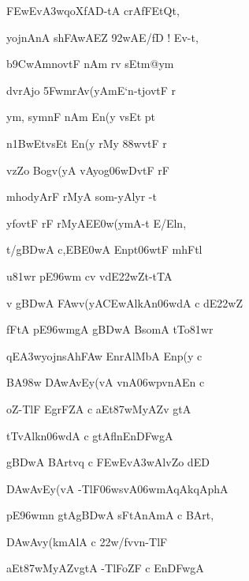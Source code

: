 {\dn \3FEwEv\3A3wqoXfAD-tA\2 crAfFEtQt, \vegdn\dontdisplaylinenum}

{\dn yojnAnA\2 sh\3FAwAEZ \392wAE/\2fD\0 {\rs !\re} Ev-t,{\dandabdn} \dontdisplaylinenum}

{\dn b\5\39CwAmnovtF nAm r\?v sEtm@ym\? \vegdn\dontdisplaylinenum}

{\dn d\?vrAjo \35FwmrAv(yAmE`n-t\?jovtF r\? \vegdn\dontdisplaylinenum}

{\dn ym, s\2ymnF nAm En(y\2 vsEt pt\?{\dandabdn} \dontdisplaylinenum}

{\dn n\4\31BwEtv\0sEt En(y\2 rMy\? \388wvtF r\? \vegdn\dontdisplaylinenum}

{\dn vzZo Bogv(yA\2  vAyog\0\306wDvtF rF{\dandabdn} \dontdisplaylinenum}

{\dn mhodyArF rMyA som-yAlyr\2 -t \vegdn\dontdisplaylinenum}

{\dn yfovtF rF rMyAE\3E0w(ymA-t\? E/Eln,{\dandabdn} \dontdisplaylinenum}

{\dn t/g\3BDwA c,EB\3E0wA Enpt\306wtF mhFtl\? \vegdn\dontdisplaylinenum}

{\dn u\381wr\? pE\396wm\? c\4v v\0dE\322wZt-tTA{\dandabdn} \dontdisplaylinenum}

{\dn {}v{\rdt} g\3BDwA \3FAwv(yA\3CEwAlkAn\306wdA c dE\322wZ\? \vegdn\dontdisplaylinenum}

{\dn fFtA pE\396wmgA g\3BDwA BsomA tTo\381wr\?{\dandabdn} \dontdisplaylinenum}

{\dn qE\3A3wyojnsAh\3FAw\2 EnrAlMbA Enp(y c \vegdn\dontdisplaylinenum}

{\dn BA\398w\2 \3DAwAvEy(vA  vnA\306wpvnAEn c{\dandabdn} \dontdisplaylinenum}

{\dn {}oZ-TlF EgrFZA\2 c aEt\387wMyAZ\0v\2 gtA \vegdn\dontdisplaylinenum}

{\dn tT\4vAlkn\306wdA c gtAf\4l\?nEn\3DFwgA{\dandabdn} \dontdisplaylinenum}

{\dn g\3BDwA BArtvq{\rdt} c \3FEwEv\3A3wAlvZo dED \vegdn\dontdisplaylinenum}

{\dn \3DAwAvEy(vA -TlF\306wsvA\0\306wmAqAkqAphA{\dandabdn} \dontdisplaylinenum}

{\dn pE\396wm\?n gtAg\3BDwA sFtAnAmA c BArt, \vegdn\dontdisplaylinenum}

{\dn \3DAwAvy\?(k\?mAlA\2 c \322w\?/f\4vvn-TlF \dontdisplaylinenum}

{\dn aEt\387wMyAZ\0vgtA -TlFoZF c En\3DFwgA \vegdn\dontdisplaylinenum}

